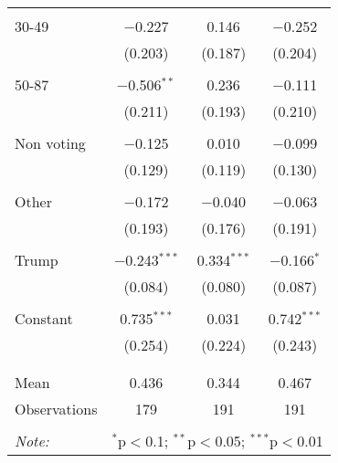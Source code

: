 \begin{tabular}{@{\extracolsep{5pt}}lccc}
  & & & \\ 
 30-49 & $-$0.227 & 0.146 & $-$0.252 \\ 
  & (0.203) & (0.187) & (0.204) \\ 
  & & & \\ 
 50-87 & $-$0.506$^{**}$ & 0.236 & $-$0.111 \\ 
  & (0.211) & (0.193) & (0.210) \\ 
  & & & \\ 
 Non voting & $-$0.125 & 0.010 & $-$0.099 \\ 
  & (0.129) & (0.119) & (0.130) \\ 
  & & & \\ 
 Other & $-$0.172 & $-$0.040 & $-$0.063 \\ 
  & (0.193) & (0.176) & (0.191) \\ 
  & & & \\ 
 Trump & $-$0.243$^{***}$ & 0.334$^{***}$ & $-$0.166$^{*}$ \\ 
  & (0.084) & (0.080) & (0.087) \\ 
  & & & \\ 
 Constant & 0.735$^{***}$ & 0.031 & 0.742$^{***}$ \\ 
  & (0.254) & (0.224) & (0.243) \\ 
  & & & \\ 
\hline \\[-1.8ex] 
Mean & 0.436 & 0.344 & 0.467 \\ 
Observations & 179 & 191 & 191 \\ 
\hline 
\hline \\[-1.8ex] 
\textit{Note:}  & \multicolumn{3}{r}{$^{*}$p$<$0.1; $^{**}$p$<$0.05; $^{***}$p$<$0.01} \\ 
\end{tabular} 
